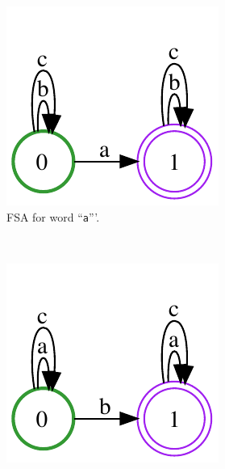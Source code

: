 \documentclass[12pt]{article}
\begin{document}
\begin{figure}
        \centering
        \begin{subfigure}[b]{0.25\textwidth}
                \centering
                \includegraphics[width=\textwidth]{cmp1}
                \caption{FSA for word ``\texttt{a}'''.}
                \label{fig:cmp1}
        \end{subfigure}%
        ~ %
        \begin{subfigure}[b]{0.25\textwidth}
                \centering
                \includegraphics[width=\textwidth]{cmp2}

\end{subfigure}
\end{figure}
\end{document}
